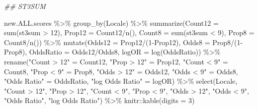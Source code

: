 \documentclass[
  letterpaper,
  DIV=11,
  numbers=noendperiod]{scrartcl}
\newenvironment{Shaded}{\begin{snugshade}}{\end{snugshade}}
\newcommand{\AttributeTok}[1]{\textcolor[rgb]{0.40,0.45,0.13}{#1}}
\newcommand{\DecValTok}[1]{\textcolor[rgb]{0.68,0.00,0.00}{#1}}
\newcommand{\DocumentationTok}[1]{\textcolor[rgb]{0.37,0.37,0.37}{\textit{#1}}}
\newcommand{\FunctionTok}[1]{\textcolor[rgb]{0.28,0.35,0.67}{#1}}
\newcommand{\NormalTok}[1]{\textcolor[rgb]{0.00,0.23,0.31}{#1}}
\newcommand{\OtherTok}[1]{\textcolor[rgb]{0.00,0.23,0.31}{#1}}
\newcommand{\SpecialCharTok}[1]{\textcolor[rgb]{0.37,0.37,0.37}{#1}}
\newcommand{\StringTok}[1]{\textcolor[rgb]{0.13,0.47,0.30}{#1}}
\begin{document}
\begin{Shaded}
\begin{Highlighting}[]
\DocumentationTok{\#\# ST3SUM}

\NormalTok{new.ALL.scores }\SpecialCharTok{\%\textgreater{}\%}
  \FunctionTok{group\_by}\NormalTok{(Locale) }\SpecialCharTok{\%\textgreater{}\%}
  \FunctionTok{summarize}\NormalTok{(}\AttributeTok{Count12 =} \FunctionTok{sum}\NormalTok{(st3sum }\SpecialCharTok{\textgreater{}} \DecValTok{12}\NormalTok{),}
            \AttributeTok{Prop12 =}\NormalTok{ Count12}\SpecialCharTok{/}\FunctionTok{n}\NormalTok{(),}
            \AttributeTok{Count8 =} \FunctionTok{sum}\NormalTok{(st3sum }\SpecialCharTok{\textless{}} \DecValTok{9}\NormalTok{),}
            \AttributeTok{Prop8 =}\NormalTok{ Count8}\SpecialCharTok{/}\FunctionTok{n}\NormalTok{()) }\SpecialCharTok{\%\textgreater{}\%}
  \FunctionTok{mutate}\NormalTok{(}\AttributeTok{Odds12 =}\NormalTok{ Prop12}\SpecialCharTok{/}\NormalTok{(}\DecValTok{1}\SpecialCharTok{{-}}\NormalTok{Prop12),}
         \AttributeTok{Odds8 =}\NormalTok{ Prop8}\SpecialCharTok{/}\NormalTok{(}\DecValTok{1}\SpecialCharTok{{-}}\NormalTok{Prop8),}
         \AttributeTok{OddsRatio =}\NormalTok{ Odds12}\SpecialCharTok{/}\NormalTok{Odds8,}
         \AttributeTok{logOR =} \FunctionTok{log}\NormalTok{(OddsRatio)) }\SpecialCharTok{\%\textgreater{}\%}
  \FunctionTok{rename}\NormalTok{(}\StringTok{"Count \textgreater{} 12"} \OtherTok{=}\NormalTok{ Count12,}
         \StringTok{"Prop \textgreater{} 12"} \OtherTok{=}\NormalTok{ Prop12,}
         \StringTok{"Count \textless{} 9"} \OtherTok{=}\NormalTok{ Count8,}
         \StringTok{"Prop \textless{} 9"} \OtherTok{=}\NormalTok{ Prop8,}
         \StringTok{"Odds \textgreater{} 12"} \OtherTok{=}\NormalTok{ Odds12,}
         \StringTok{"Odds \textless{} 9"} \OtherTok{=}\NormalTok{ Odds8,}
         \StringTok{"Odds Ratio"} \OtherTok{=}\NormalTok{ OddsRatio,}
         \StringTok{"log Odds Ratio"} \OtherTok{=}\NormalTok{ logOR) }\SpecialCharTok{\%\textgreater{}\%}
  \FunctionTok{select}\NormalTok{(Locale, }\StringTok{"Count \textgreater{} 12"}\NormalTok{, }\StringTok{"Prop \textgreater{} 12"}\NormalTok{, }\StringTok{"Count \textless{} 9"}\NormalTok{, }\StringTok{"Prop \textless{} 9"}\NormalTok{, }\StringTok{"Odds \textgreater{} 12"}\NormalTok{, }\StringTok{"Odds \textless{} 9"}\NormalTok{, }\StringTok{"Odds Ratio"}\NormalTok{, }\StringTok{"log Odds Ratio"}\NormalTok{) }\SpecialCharTok{\%\textgreater{}\%}
\NormalTok{  knitr}\SpecialCharTok{::}\FunctionTok{kable}\NormalTok{(}\AttributeTok{digits =} \DecValTok{3}\NormalTok{)}
\end{Highlighting}
\end{Shaded}
\end{document}
